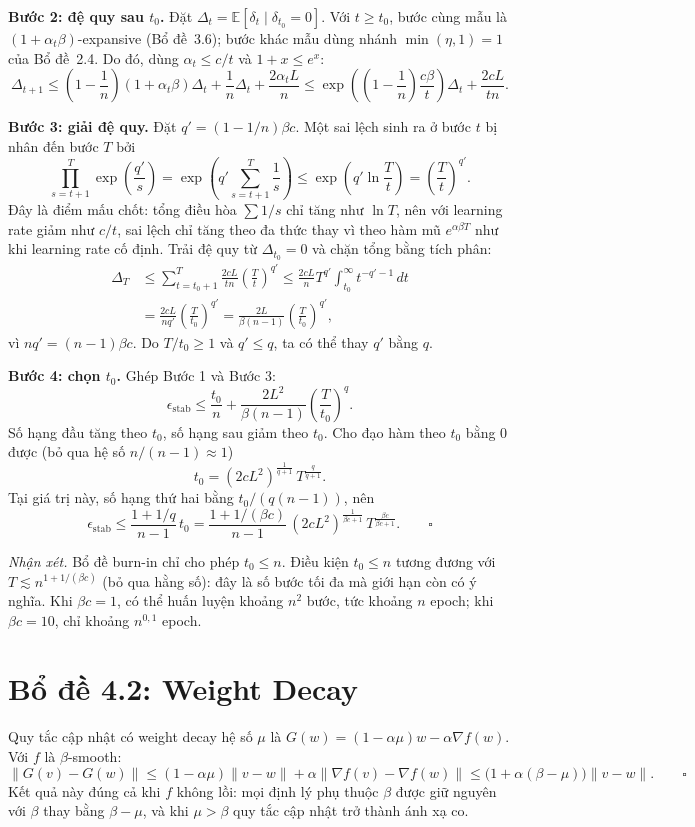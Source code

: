 \textbf{Bước 2: đệ quy sau $t_0$.} Đặt $\Delta_t = \mathbb{E}[\delta_t \mid \delta_{t_0} = 0]$. Với $t \ge t_0$, bước cùng mẫu là $(1 + \alpha_t\beta)$-expansive (Bổ đề~3.6); bước khác mẫu dùng nhánh $\min(\eta, 1) = 1$ của Bổ đề~2.4. Do đó, dùng $\alpha_t \le c/t$ và $1 + x \le e^x$:
\[
\Delta_{t+1} \le \left(1 - \frac{1}{n}\right)(1 + \alpha_t\beta)\Delta_t + \frac{1}{n}\Delta_t + \frac{2\alpha_t L}{n} \le \exp\left(\left(1 - \frac{1}{n}\right)\frac{c\beta}{t}\right)\Delta_t + \frac{2cL}{tn}.
\]

\textbf{Bước 3: giải đệ quy.} Đặt $q' = (1 - 1/n)\beta c$. Một sai lệch sinh ra ở bước $t$ bị nhân đến bước $T$ bởi
\[
\prod_{s=t+1}^{T}\exp\left(\frac{q'}{s}\right) = \exp\left(q'\sum_{s=t+1}^{T}\frac{1}{s}\right) \le \exp\left(q'\ln\frac{T}{t}\right) = \left(\frac{T}{t}\right)^{q'}.
\]
Đây là điểm mấu chốt: tổng điều hòa $\sum 1/s$ chỉ tăng như $\ln T$, nên với learning rate giảm như $c/t$, sai lệch chỉ tăng theo đa thức thay vì theo hàm mũ $e^{\alpha\beta T}$ như khi learning rate cố định. Trải đệ quy từ $\Delta_{t_0} = 0$ và chặn tổng bằng tích phân:
\[
\begin{aligned}
\Delta_T &\le \sum_{t=t_0+1}^{T}\frac{2cL}{tn}\left(\frac{T}{t}\right)^{q'} \le \frac{2cL}{n}T^{q'}\int_{t_0}^{\infty} t^{-q'-1}\,dt \\
&= \frac{2cL}{n q'}\left(\frac{T}{t_0}\right)^{q'} = \frac{2L}{\beta(n-1)}\left(\frac{T}{t_0}\right)^{q'},
\end{aligned}
\]
vì $n q' = (n-1)\beta c$. Do $T/t_0 \ge 1$ và $q' \le q$, ta có thể thay $q'$ bằng $q$.

\textbf{Bước 4: chọn $t_0$.} Ghép Bước 1 và Bước 3:
\[
\epsilon_{\mathrm{stab}} \le \frac{t_0}{n} + \frac{2L^2}{\beta(n-1)}\left(\frac{T}{t_0}\right)^{q}.
\]
Số hạng đầu tăng theo $t_0$, số hạng sau giảm theo $t_0$. Cho đạo hàm theo $t_0$ bằng $0$ được (bỏ qua hệ số $n/(n-1) \approx 1$)
\[
t_0 = (2cL^2)^{\frac{1}{q+1}}\,T^{\frac{q}{q+1}}.
\]
Tại giá trị này, số hạng thứ hai bằng $t_0/(q(n-1))$, nên
\[
\epsilon_{\mathrm{stab}} \le \frac{1 + 1/q}{n-1}\,t_0 = \frac{1 + 1/(\beta c)}{n-1}\,(2cL^2)^{\frac{1}{\beta c+1}}\,T^{\frac{\beta c}{\beta c+1}}. \qquad \square
\]

\textit{Nhận xét.} Bổ đề burn-in chỉ cho phép $t_0 \le n$. Điều kiện $t_0 \le n$ tương đương với $T \lesssim n^{1 + 1/(\beta c)}$ (bỏ qua hằng số): đây là số bước tối đa mà giới hạn còn có ý nghĩa. Khi $\beta c = 1$, có thể huấn luyện khoảng $n^2$ bước, tức khoảng $n$ epoch; khi $\beta c = 10$, chỉ khoảng $n^{0{,}1}$ epoch.

\section{Bổ đề 4.2: Weight Decay}

Quy tắc cập nhật có weight decay hệ số $\mu$ là $G(w) = (1 - \alpha\mu)w - \alpha\nabla f(w)$. Với $f$ là $\beta$-smooth:
\[
\|G(v) - G(w)\| \le (1 - \alpha\mu)\|v - w\| + \alpha\|\nabla f(v) - \nabla f(w)\| \le \bigl(1 + \alpha(\beta - \mu)\bigr)\|v - w\|. \qquad \square
\]
Kết quả này đúng cả khi $f$ không lồi: mọi định lý phụ thuộc $\beta$ được giữ nguyên với $\beta$ thay bằng $\beta - \mu$, và khi $\mu > \beta$ quy tắc cập nhật trở thành ánh xạ co.
